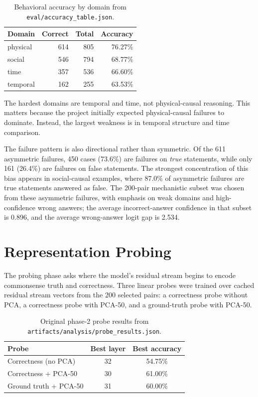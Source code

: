 \documentclass{article}
\begin{document}
\begin{table}[t]
\centering
\begin{tabular}{lrrr}
\toprule
Domain & Correct & Total & Accuracy \\
\midrule
physical & 614 & 805 & 76.27\% \\
social & 546 & 794 & 68.77\% \\
time & 357 & 536 & 66.60\% \\
temporal & 162 & 255 & 63.53\% \\
\bottomrule
\end{tabular}
\caption{Behavioral accuracy by domain from \texttt{eval/accuracy\_table.json}.}
\label{tab:behavioral-domain}
\end{table}

The hardest domains are temporal and time, not physical-causal reasoning. This matters because the project initially expected physical-causal failures to dominate. Instead, the largest weakness is in temporal structure and time comparison.

The failure pattern is also directional rather than symmetric. Of the 611 asymmetric failures, 450 cases (73.6\%) are failures on \emph{true} statements, while only 161 (26.4\%) are failures on false statements. The strongest concentration of this bias appears in social-causal examples, where 87.0\% of asymmetric failures are true statements answered as false. The 200-pair mechanistic subset was chosen from these asymmetric failures, with emphasis on weak domains and high-confidence wrong answers; the average incorrect-answer confidence in that subset is 0.896, and the average wrong-answer logit gap is 2.534.

\section{Representation Probing}

The probing phase asks where the model's residual stream begins to encode commonsense truth and correctness. Three linear probes were trained over cached residual stream vectors from the 200 selected pairs: a correctness probe without PCA, a correctness probe with PCA-50, and a ground-truth probe with PCA-50.

\begin{table}[t]
\centering
\begin{tabular}{lcc}
\toprule
Probe & Best layer & Best accuracy \\
\midrule
Correctness (no PCA) & 32 & 54.75\% \\
Correctness + PCA-50 & 30 & 61.00\% \\
Ground truth + PCA-50 & 31 & 60.00\% \\
\bottomrule
\end{tabular}
\caption{Original phase-2 probe results from \texttt{artifacts/analysis/probe\_results.json}.}
\label{tab:probe-main}
\end{table}
\end{document}
